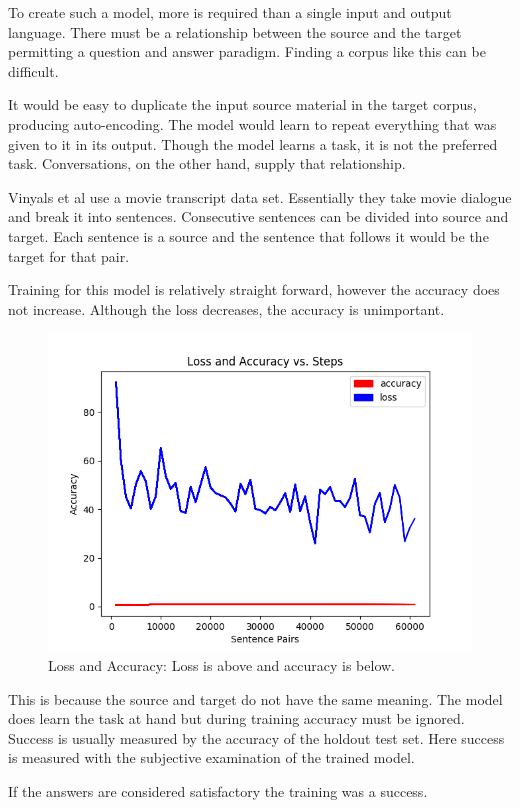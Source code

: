 To create such a model, more is required than a single input and output language. There must be a relationship between the source and the target permitting a question and answer paradigm. Finding a corpus like this can be difficult.

It would be easy to duplicate the input source material in the target corpus, producing auto-encoding. The model would learn to repeat everything that was given to it in its output. Though the model learns a task, it is not the preferred task. Conversations, on the other hand, supply that relationship. 

Vinyals et al \cite{DBLP:journals/corr/VinyalsL15} use a movie transcript data set. Essentially they take movie dialogue and break it into sentences. Consecutive sentences can be divided into source and target. Each sentence is a source and the sentence that follows it would be the target for that pair. 

Training for this model is relatively straight forward, however the accuracy does not increase. Although the loss decreases, the accuracy is unimportant. %

\begin{figure}[H]
	\begin{center}
	
	\includegraphics[scale=0.5]{Figure_1}
		
\end{center}
	\caption[Loss and Accuracy]{Loss and Accuracy: Loss is above and accuracy is below.}
	

\end{figure}

This is because the source and target do not have the same meaning. The model does learn the task at hand but during training accuracy must be ignored. Success is usually measured by the accuracy of the holdout test set. Here success is measured with the subjective examination of the trained model.

If the answers are considered satisfactory the training was a success. 

